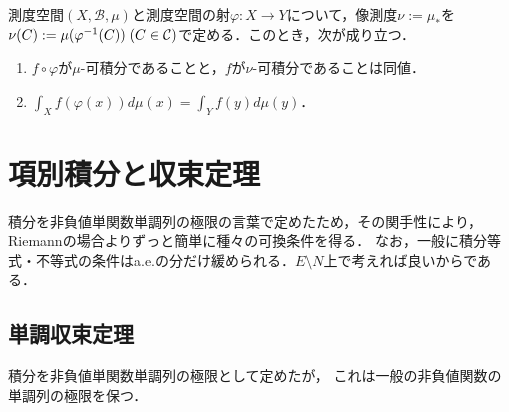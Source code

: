 \documentclass[uplatex, dvipdfmx]{jsreport}
\renewcommand{\B}{\mathcal{B}}
\begin{document}
\begin{theorem}
    測度空間$(X,\B,\mu)$と測度空間の射$\varphi:X\to Y$について，像測度$\nu:=\mu_*$を$\nu(C):=\mu(\varphi^{-1}(C))\;(C\in\mathcal{C})$で定める．このとき，次が成り立つ．
    \begin{enumerate}
        \item $f\circ\varphi$が$\mu$-可積分であることと，$f$が$\nu$-可積分であることは同値．
        \item $\int_Xf(\varphi(x))d\mu(x)=\int_Yf(y)d\mu(y)$．
    \end{enumerate}
\end{theorem}

\section{項別積分と収束定理}

\begin{tcolorbox}[colframe=ForestGreen, colback=ForestGreen!10!white,breakable,colbacktitle=ForestGreen!40!white,coltitle=black,fonttitle=\bfseries\sffamily,
title=]
    積分を非負値単関数単調列の極限の言葉で定めたため，その関手性により，Riemannの場合よりずっと簡単に種々の可換条件を得る．
    なお，一般に積分等式・不等式の条件はa.e.の分だけ緩められる．$E\setminus N$上で考えれば良いからである．
\end{tcolorbox}

\subsection{単調収束定理}

\begin{tcolorbox}[colframe=ForestGreen, colback=ForestGreen!10!white,breakable,colbacktitle=ForestGreen!40!white,coltitle=black,fonttitle=\bfseries\sffamily,
title=]
    積分を非負値単関数単調列の極限として定めたが，
    これは一般の非負値関数の単調列の極限を保つ．
\end{tcolorbox}
\end{document}
